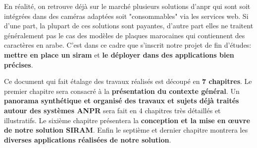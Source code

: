 En réalité, on retrouve déjà sur le marché plusieurs solutions d’\acrshort{anpr} qui sont soit intégrées dans des caméras adaptées soit "consommables" via les services web. Si d’une part, la plupart de ces solutions sont payantes, d'autre part elles ne traitent généralement pas le cas des modèles de plaques marocaines qui contiennent des caractères en arabe. C’est dans ce cadre que s’inscrit notre projet de fin d’études: \textbf{mettre en place un \acrfull{siram}} et \textbf{le déployer dans des applications bien précises}.

Ce document qui fait étalage des travaux réalisés est découpé en \textbf{7 chapitres}. Le premier chapitre sera consacré à la  \textbf{présentation du contexte général}. Un \textbf{panorama synthétique et organisé des travaux et sujets déjà traités autour des systèmes ANPR} sera fait en 4 chapitres très détaillés et illustratifs. Le sixième chapitre présentera la \textbf{conception et la mise en œuvre de notre solution SIRAM}. Enfin le septième et dernier chapitre montrera les \textbf{diverses applications réalisées de notre solution}.